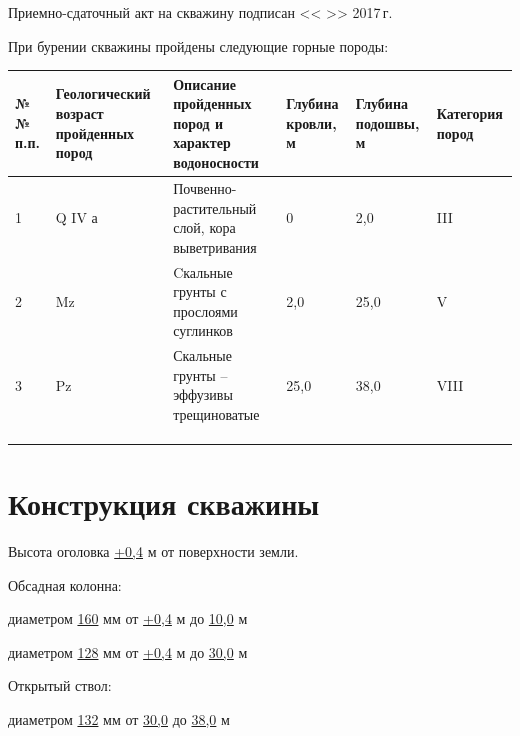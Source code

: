 \documentclass[a4paper,12pt]{article} %
\newcommand{\txtYear}{2017}			%
\begin{document}
	\bigskip
	
	Приемно-сдаточный акт на скважину подписан << \underline{\hspace{0.7cm}} >> \underline{\hspace{3cm}} \txtYear \,г.	
	
	\pagebreak
	
	При бурении скважины пройдены следующие горные породы:

	\begin{table}[!h]\footnotesize
	\centering
	\begin{tabular}[c]{|p{0.7cm}|p{2cm}|p{7cm}|p{1.5cm}|p{1.5cm}|p{1cm}|}
		\hline 
		№№ п.п. & Геологи\-ческий возраст пройденных пород & Описание пройденных пород и характер водоносности & Глубина кровли, м & Глубина подошвы, м & Катего\-рия пород \\ 
		\hline 
		1 & Q IV а & Почвенно-растительный слой, кора выветривания & 0 & 2,0 & III\\ 
		\hline 
		2 & Mz & Cкальные грунты с прослоями суглинков & 2,0 & 25,0 & V \\ 
		\hline 
		3 & Pz & Скальные грунты – эффузивы трещиноватые & 25,0 & 38,0 & VIII \\ 
		\hline 
		&  &  &  &  &  \\ 
		\hline 
		&  &  &  &  &  \\ 
		\hline 
		&  &  &  &  &  \\ 
		\hline 
	\end{tabular} 
	\end{table}

	\bigskip
	
	\section*{Конструкция скважины}

	Высота оголовка	\underline{+0,4} м	от поверхности земли. 
	
	\bigskip

	Обсадная колонна:

	диаметром \underline{160} мм от \underline{+0,4} м до \underline{10,0}  м  		
	
	диаметром \underline{128} мм от \underline{+0,4} м до \underline{30,0} м
	
	\bigskip

	Открытый ствол:

	 диаметром \underline{132} мм от \underline{30,0} до \underline{38,0} м 
    
\end{document}

